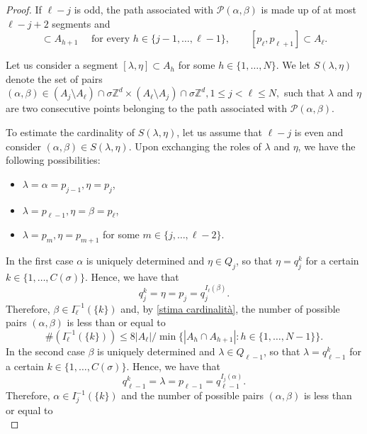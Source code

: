 \documentclass{article}
\theoremstyle{plain}
\theoremstyle{definition}
\def\ZZ{{\mathbb Z}}
\newcommand{\s}{\sigma}
\numberwithin{equation}{section}
\begin{document}
\begin{proof}
If $\ell-j$ is odd, the path associated with $\mathcal P(\alpha,\beta)$ is made up of at most $\ell-j+2$ segments and 
\begin{equation*}
  [p_h,p_{h+1}]\subset A_{h+1} \quad\text{ for every } h\in\{j-1,\dots, \ell-1\}, \qquad [p_{\ell},p_{\ell+1}]\subset A_\ell.
\end{equation*}

Let us consider a segment $[\lambda,\eta]\subset A_{h}$ for some $h\in\{1,\dots,N\}$. We let $S(\lambda,\eta)$ denote the set of pairs $(\alpha,\beta)\in(A_j\setminus A_\ell)\cap\s\ZZ^d\times (A_\ell\setminus A_j)\cap\s\ZZ^d, 1\leq j<\ell\leq N,$ such that $\lambda$ and $\eta$ are two consecutive points belonging to the path associated with $\mathcal{P}(\alpha,\beta)$. 

To estimate the cardinality of $S(\lambda,\eta)$, let us assume that $\ell-j$ is even and consider $(\alpha,\beta)\in S(\lambda,\eta)$.  Upon exchanging the roles of $\lambda$ and $\eta$, we have the following possibilities:
\begin{itemize}
    \item[(i)] $\lambda=\alpha=p_{j-1}, \eta=p_j$,
     \item[(ii)] $  \lambda=p_{\ell-1}, \eta=\beta=p_\ell$,
      \item[(iii)] $\lambda=p_m,  \eta=p_{m+1}$ for some $m\in\{j,\dots,\ell-2\}$.
\end{itemize}
In the first case $\alpha$ is uniquely determined and $\eta\in Q_j$, so that $\eta=q_j^{k}$ for a certain $k\in\{1,\dots, C(\s)\}$. Hence, we have that 
\begin{equation*}
q_j^k=\eta=p_j=q^{I_\ell(\beta)}_j.    
\end{equation*}
Therefore, $\beta\in I_\ell^{-1}(\{k\})$ and, by \eqref{stima cardinalità}, the number of possible pairs $(\alpha,\beta)$ is less than or equal to 
\begin{equation*}
    \#(I_\ell^{-1}(\{k\})) \leq 8|A_\ell|/\min\{|A_h\cap A_{h+1}| :  h\in\{1,\dots, N-1\}\}.
\end{equation*}
In the second case $\beta$ is uniquely determined and $\lambda\in Q_{\ell-1}$, so that $\lambda=q_{\ell-1}^{k}$ for a certain $k\in\{1,\dots, C(\s)\}$. Hence, we have that 
\begin{equation*}
    q_{\ell-1}^{k}= \lambda=p_{\ell-1}=q^{I_j(\alpha)}_{\ell-1}.
\end{equation*}
Therefore, $\alpha\in I_j^{-1}(\{k\})$ and the number of possible pairs $(\alpha,\beta)$ is less than or equal to 
\begin{equation*}

\end{equation*}
\end{proof}
\end{document}
